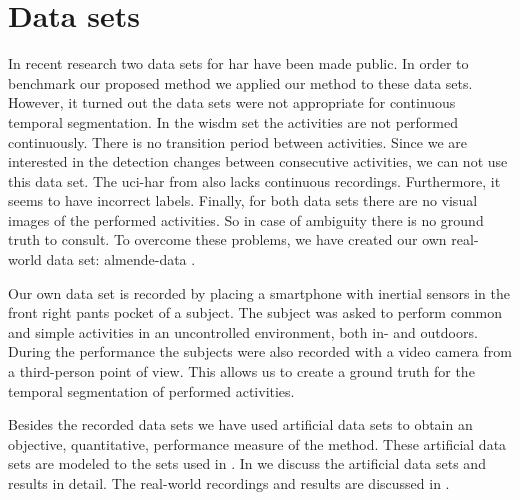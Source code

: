 \section{Data sets}\label{sec:intro_data_sets}
In recent research two data sets for \gls{har} have been made public.
In order to benchmark our proposed method we applied our method to these data sets.
However, it turned out the data sets were not appropriate for continuous temporal segmentation.
In the \gls{wisdm} set \cite{kwapisz2011activity} the activities are not performed continuously.
There is no transition period between activities.
Since we are interested in the detection changes between consecutive activities, we can not use this data set.
The \gls{uci-har} from \cite{anguita2012human} also lacks continuous recordings.
Furthermore, it seems to have incorrect labels.
Finally, for both data sets there are no visual images of the performed activities.
So in case of ambiguity there is no ground truth to consult.
To overcome these problems, we have created our own real-world data set: \acrlong{almende-data} \cite{vlasveld2014acras}.

Our own data set is recorded by placing a smartphone with inertial sensors in the front right pants pocket of a subject.
The subject was asked to perform common and simple activities in an uncontrolled environment, both in- and outdoors.
During the performance the subjects were also recorded with a video camera from a third-person point of view.
This allows us to create a ground truth for the temporal segmentation of performed activities.

Besides the recorded data sets we have used artificial data sets to obtain an objective, quantitative, performance measure of the method.
These artificial data sets are modeled to the sets used in \cite{camci2010change,takeuchi2006unifying}.
In  we discuss the artificial data sets and results in detail.
The real-world recordings and results are discussed in .

